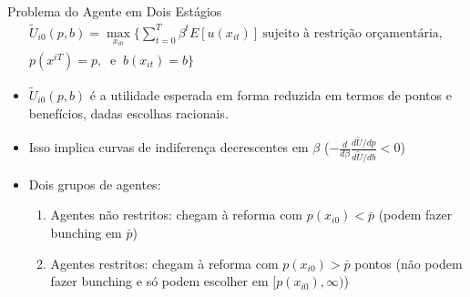 \begin{frame}[label=theory]{Problema do Agente em Dois Estágios}
    \begin{align*}
        \tilde{U}_{i0}(p,b) =\max_{x_{i0}} \Big\{\sum_{t=0}^T\beta^t E[u(x_{it})]\ \text{sujeito à restrição orçamentária}, \\
         p(x^{iT})=p,\ \text{ e }\ b(x_{it})=b\Big\}
    \end{align*}
    \begin{itemize}
        \item $\tilde{U}_{i0}(p,b)$ é a utilidade esperada em forma reduzida em termos de pontos e benefícios, dadas escolhas racionais.
        \item Isso implica curvas de indiferença decrescentes em $\beta$ ($-\frac{d}{d\beta}\frac{d\tilde U/dp}{d\tilde U/db}<0$)
        \item Dois grupos de agentes:
        \begin{enumerate}
            \item Agentes não restritos: chegam à reforma com $p(x_{i0})<\bar p$ (podem fazer bunching em $\bar p$)
            \item Agentes restritos: chegam à reforma com $p(x_{i0})>\bar p$ pontos (não podem fazer bunching e só podem escolher em $[p(x_{i0}),\infty)$)
        \end{enumerate}
    \end{itemize}
\end{frame}

